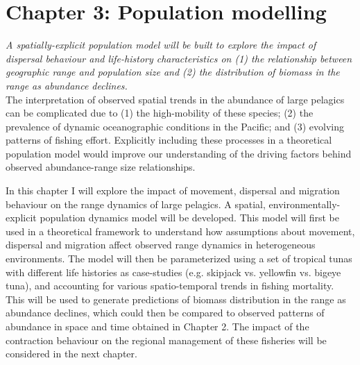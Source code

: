 \documentclass{article}
\begin{document}

\newpage
\section*{Chapter 3: Population modelling}
\addtocounter{section}{1}
\setcounter{subsection}{0}

\emph{A spatially-explicit population model will be built to
explore the impact of dispersal behaviour and life-history
characteristics on (1) the
relationship between geographic range and population size and (2) the
distribution of biomass in the range as abundance declines.}\\

The interpretation of observed spatial trends in the abundance of
large pelagics can be complicated due to (1) the high-mobility of
these species; (2) the prevalence of dynamic oceanographic conditions
in the Pacific; and (3) evolving patterns of fishing
effort. Explicitly including these processes in a
theoretical population model would improve our understanding of the
driving factors behind observed abundance-range size relationships.

In this chapter I will explore the impact of movement, dispersal and
migration behaviour on the range dynamics of large
pelagics. A spatial, environmentally-explicit population dynamics model will
be developed. This model will first be used in a theoretical framework
to understand how assumptions about movement, dispersal and migration
affect observed range dynamics in heterogeneous environments. The
model will then be parameterized using a set
of tropical tunas with different life histories as case-studies
(e.g. skipjack vs. yellowfin vs. bigeye tuna), and accounting for various
spatio-temporal trends in fishing mortality. This will be used to generate
 predictions of biomass distribution in the range as abundance
 declines, which could then be compared to observed
patterns of abundance in space and time obtained in Chapter 2. The
impact of the contraction behaviour on the regional management of
these fisheries will be considered in the next chapter.

\end{document}
